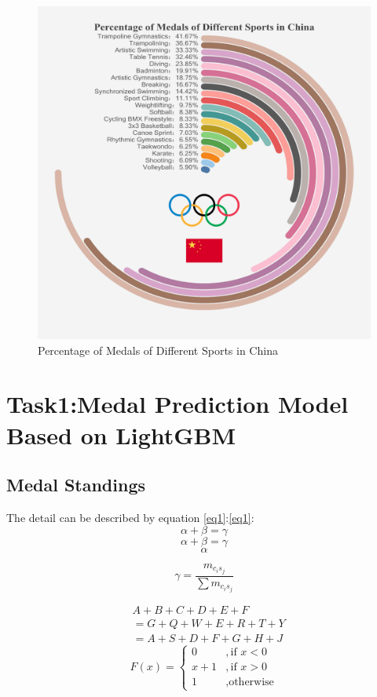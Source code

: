 \documentclass[12pt]{article}  %
\begin{document}
\begin{figure}[htbp]
	\centering
	\includegraphics[width=12cm]{img/Percentage.jpg}
	\caption{Percentage of Medals of Different Sports in China}
	\label{fig:aa}
\end{figure}






\section{Task1:Medal Prediction Model Based on LightGBM}
\subsection{Medal Standings}
The detail can be described by equation \eqref{eq1}:\autoref{eq1}:
\begin{equation}\label{eq1}
\alpha+\beta=\gamma
\end{equation}
\[
\alpha+\beta=\gamma
\]
$$\alpha$$


\[
\gamma = \frac{m_{c_i s_j}}{\sum m_{c_i s_j}}
\]

\begin{equation}\label{eq2}
	\begin{split}
	&A+B+C+D+E+F\\
	&=G+Q+W+E+R+T+Y\\
	&=A+S+D+F+G+H+J
	\end{split}
\end{equation}
\begin{equation}\label{eq3}
	F(x)=
	\begin{cases}
		0&,\text{if $x<0$}\\
		x+1&,\text{if $x>0$}\\
		1&,\text{otherwise}
			\end{cases}
\end{equation}
\end{document}
